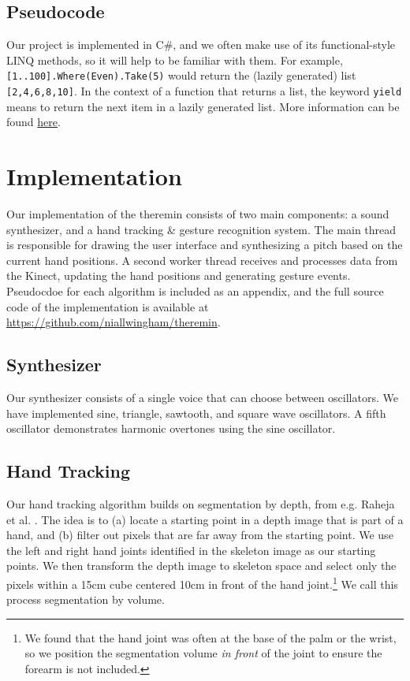 \documentclass[12pt]{article}
\begin{document}
\subsection{Pseudocode}
Our project is implemented in C\#, and we often make use of its functional-style LINQ methods, so it will help to be familiar with them.  For example, \texttt{[1..100].Where(Even).Take(5)} would return the (lazily generated) list \texttt{[2,4,6,8,10]}.  In the context of a function that returns a list, the keyword \texttt{yield} means to return the next item in a lazily generated list.  More information can be found \href{http://msdn.microsoft.com/en-ca/library/vstudio/bb397947.aspx}{here}.



\section{Implementation}
Our implementation of the theremin consists of two main components: a sound synthesizer, and a hand tracking \& gesture recognition system.  The main thread is responsible for drawing the user interface and synthesizing a pitch based on the current hand positions.  A second worker thread receives and processes data from the Kinect, updating the hand positions and generating gesture events.  Pseudocdoe for each algorithm is included as an appendix, and the full source code of the implementation is available at \href{https://github.com/niallwingham/theremin}{https://github.com/niallwingham/theremin}.

\subsection{Synthesizer}
Our synthesizer consists of a single voice that can choose between oscillators.  We have implemented sine, triangle, sawtooth, and square wave oscillators.  A fifth oscillator demonstrates harmonic overtones using the sine oscillator.

\subsection{Hand Tracking}
Our hand tracking algorithm builds on segmentation by depth, from e.g. Raheja et al. \cite{Rah11}.  The idea is to (a) locate a starting point in a depth image that is part of a hand, and (b) filter out pixels that are far away from the starting point.  We use the left and right hand joints identified in the skeleton image as our starting points.  We then transform the depth image to skeleton space and select only the pixels within a 15cm cube centered 10cm in front of the hand joint.\footnote{We found that the hand joint was often at the base of the palm or the wrist, so we position the segmentation volume \emph{in front} of the joint to ensure the forearm is not included.}  We call this process segmentation by volume.
\end{document}
